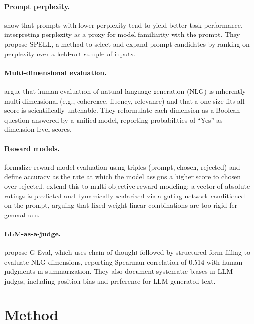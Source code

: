 \documentclass[11pt,a4paper]{article}
\begin{document}
\paragraph{Prompt perplexity.}
\citet{promptperplexity2022} show that prompts with lower perplexity tend to yield better task performance, interpreting perplexity as a proxy for model familiarity with the prompt. They propose SPELL, a method to select and expand prompt candidates by ranking on perplexity over a held-out sample of inputs.

\paragraph{Multi-dimensional evaluation.}
\citet{unieval2022} argue that human evaluation of natural language generation (NLG) is inherently multi-dimensional (e.g., coherence, fluency, relevance) and that a one-size-fits-all score is scientifically untenable. They reformulate each dimension as a Boolean question answered by a unified model, reporting probabilities of ``Yes'' as dimension-level scores.

\paragraph{Reward models.}
\citet{rewardbench2024} formalize reward model evaluation using triples (prompt, chosen, rejected) and define accuracy as the rate at which the model assigns a higher score to chosen over rejected. \citet{armorm2024} extend this to multi-objective reward modeling: a vector of absolute ratings is predicted and dynamically scalarized via a gating network conditioned on the prompt, arguing that fixed-weight linear combinations are too rigid for general use.

\paragraph{LLM-as-a-judge.}
\citet{geval2023} propose G-Eval, which uses chain-of-thought followed by structured form-filling to evaluate NLG dimensions, reporting Spearman correlation of 0.514 with human judgments in summarization. They also document systematic biases in LLM judges, including position bias and preference for LLM-generated text.

\section{Method}
\end{document}
